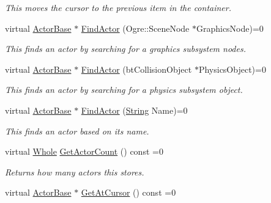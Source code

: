 \begin{DoxyCompactItemize}
\begin{DoxyCompactList}\small\item\em This moves the cursor to the previous item in the container. \item\end{DoxyCompactList}\item 
virtual \hyperlink{classMezzanine_1_1ActorBase}{ActorBase} $\ast$ \hyperlink{classMezzanine_1_1ActorContainerBase_ace7273ccf53bc37cca7defbd703880f9}{FindActor} (Ogre::SceneNode $\ast$GraphicsNode)=0
\begin{DoxyCompactList}\small\item\em This finds an actor by searching for a graphics subsystem nodes. \item\end{DoxyCompactList}\item 
virtual \hyperlink{classMezzanine_1_1ActorBase}{ActorBase} $\ast$ \hyperlink{classMezzanine_1_1ActorContainerBase_a405caa151d3556786344be12ac0b6c2a}{FindActor} (btCollisionObject $\ast$PhysicsObject)=0
\begin{DoxyCompactList}\small\item\em This finds an actor by searching for a physics subsystem object. \item\end{DoxyCompactList}\item 
virtual \hyperlink{classMezzanine_1_1ActorBase}{ActorBase} $\ast$ \hyperlink{classMezzanine_1_1ActorContainerBase_aafa4b056aaa0161d3d814bfb56bd9ae9}{FindActor} (\hyperlink{namespaceMezzanine_acf9fcc130e6ebf08e3d8491aebcf1c86}{String} Name)=0
\begin{DoxyCompactList}\small\item\em This finds an actor based on its name. \item\end{DoxyCompactList}\item 
virtual \hyperlink{namespaceMezzanine_adcbb6ce6d1eb4379d109e51171e2e493}{Whole} \hyperlink{classMezzanine_1_1ActorContainerBase_a30b3c8d876a51510a8e29043a3c2b9de}{GetActorCount} () const =0
\begin{DoxyCompactList}\small\item\em Returns how many actors this stores. \item\end{DoxyCompactList}\item 
virtual \hyperlink{classMezzanine_1_1ActorBase}{ActorBase} $\ast$ \hyperlink{classMezzanine_1_1ActorContainerBase_ae339ced44550bc493685ab7e499a9e65}{GetAtCursor} () const =0

\end{DoxyCompactItemize}
